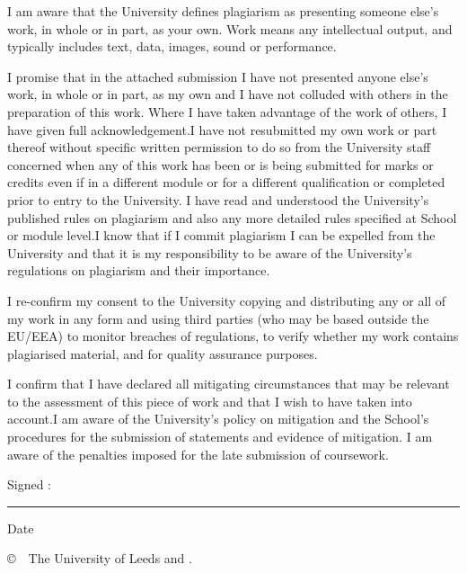 
\begin{ipstatement} %

I am aware that the University defines plagiarism as presenting someone else’s work, in whole or in part, as your own. Work means any intellectual output, and typically includes text, data, images, sound or performance.

I promise that in the attached submission I have not presented anyone else’s work, in whole or in part, as my own and I have not colluded with others in the preparation of this work. Where I have taken advantage of the work of others, I have given full acknowledgement.I have not resubmitted my own work or part thereof without specific written permission to do so from the University staff concerned when any of this work has been or is being submitted for marks or credits even if in a different module or for a different qualification or completed prior to entry to the University. I have read and understood the University’s published rules on plagiarism and also any more detailed rules specified at School or module level.I know that if I commit plagiarism I can be expelled from the University and that it is my responsibility to be aware of the University’s regulations on plagiarism and their importance.

I re-confirm my consent to the University copying and distributing any or all of my work in any form and using third parties (who may be based outside the EU/EEA) to monitor breaches of regulations, to verify whether my work contains plagiarised material, and for quality assurance purposes. 

I confirm that I have declared all mitigating circumstances that may be relevant to the assessment of this piece of work and that I wish to have taken into account.I am aware of the University’s policy on mitigation and the School’s procedures for the submission of statements and evidence of mitigation. I am aware of the penalties imposed for the late submission of coursework.
\\
\vspace{1cm}

{\large Signed :\space}\rule{7cm}{0.2pt}{\large \space Date}\hrulefill\\

\hspace*{1.5cm}\theAuthor

\vspace{1cm}

\copyright\ \the\year\ The University of Leeds and \theAuthor.

\end{ipstatement}


